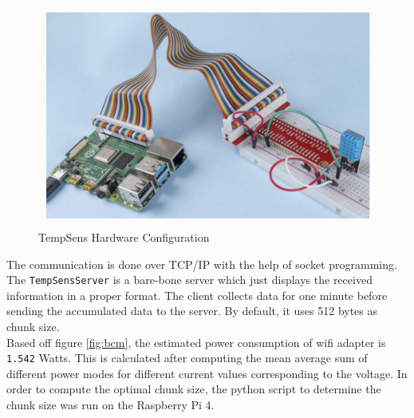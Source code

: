 \begin{figure}
    \begin{center}
        \includegraphics[scale=0.45]{Figs/circuit.png}    
    \end{center}
    \caption{TempSens Hardware Configuration  \cite{circuit}}
    \label{fig:circuit}
\end{figure}

The communication is done over TCP/IP with the help of socket programming. The \texttt{TempSensServer} 
is a bare-bone server which just displays the received information in a proper format. The client collects data for 
one minute before sending the accumulated data to the server. By default, it uses 512 bytes as chunk size. \\
Based off figure \ref{fig:bcm}, the estimated power consumption of wifi adapter is \texttt{1.542} Watts. This 
is calculated after computing the mean average sum of different power modes for different current values 
corresponding to the voltage. In order to compute the optimal chunk size, the python script to determine the 
chunk size was run on the Raspberry Pi 4. \\

